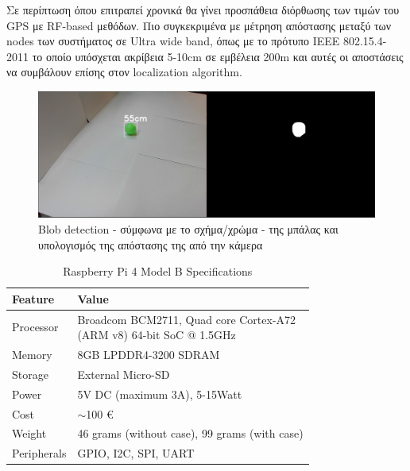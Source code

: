 Σε περίπτωση όπου επιτραπεί χρονικά θα γίνει προσπάθεια διόρθωσης των τιμών του 
GPS με RF-based μεθόδων. Πιο συγκεκριμένα με μέτρηση απόστασης μεταξύ των nodes των 
συστήματος σε Ultra wide band, όπως με το πρότυπο IEEE 802.15.4-2011 το οποίο υπόσχεται
ακρίβεια 5-10cm σε εμβέλεια 200m και αυτές οι αποστάσεις να συμβάλουν επίσης στον localization
algorithm.


\begin{figure}[thpb]
  \centering
  \includegraphics[width=\linewidth]{Images/Thesis-Proposal-shape-color-detection.png}
  \caption{Blob detection - σύμφωνα με το σχήμα/χρώμα - της μπάλας και υπολογισμός της απόστασης της από την κάμερα}
  \label{fig:2}
\end{figure}


\begin{table}[H]
  \caption[]{Raspberry Pi 4 Model B Specifications}
  \label{tab:1}
  \centering
  \begin{tabular}{ll}
      \hline
      \textbf{Feature} & \textbf{Value}  \\
      \hline
          Processor & \Centerstack{Broadcom BCM2711, Quad core Cortex-A72 \\(ARM v8) 64-bit SoC @ 1.5GHz }\\
          Memory & 8GB LPDDR4-3200 SDRAM \\
          Storage & External Micro-SD \\  
          Power & 5V DC (maximum 3A), 5-15Watt \\
          Cost & $\sim$100 €\\
          Weight & 46 grams (without case), 99 grams (with case) \\
          Peripherals & GPIO, I2C, SPI, UART \\
          \hline
  \end{tabular}
\end{table}


